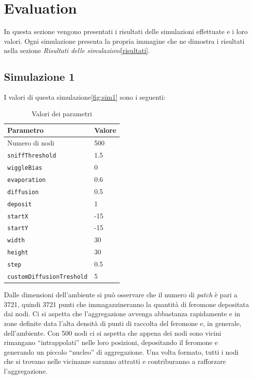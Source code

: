 \chapter{Evaluation}
In questa sezione vengono presentati i risultati delle simulazioni effettuate e i loro valori.
Ogni simulazione presenta la propria immagine che ne dimostra i risultati nella sezione \textit{Risultati delle simulazioni}\space\cref{risultati}.
\section{Simulazione 1}\label{sim1}
I valori di questa simulazione\space \cref{fig:sim1} sono i seguenti:
\begin{table}[ht]
    \centering
    \caption{Valori dei parametri}
    \begin{tabular}{ll}
        \toprule
        Parametro                   & Valore \\
        \midrule
        Numero di nodi              & 500    \\
        \texttt{sniffThreshold}     & 1.5    \\
        \texttt{wiggleBias}         & 0      \\
        \texttt{evaporation}        & 0.6    \\
        \texttt{diffusion}          & 0.5    \\
        \texttt{deposit}            & 1      \\
        \texttt{startX}             & -15    \\
        \texttt{startY}             & -15    \\
        \texttt{width}              & 30     \\
        \texttt{height}             & 30     \\
        \texttt{step}               & 0.5    \\
        \texttt{customDiffusionTreshold} & 5 \\
        \bottomrule
    \end{tabular}\label{tab:parametri1}
\end{table}\newline
Dalle dimensioni dell'ambiente si può osservare che il numero di \textit{patch} è pari a 3721, quindi 3721 punti che 
immagazzineranno la quantità di feromone depositata dai nodi. Ci si aspetta che l'aggregazione avvenga abbastanza rapidamente e in
zone definite data l'alta densità di punti di raccolta del feromone e, in generale, dell'ambiente. Con 500 nodi 
ci si aspetta che appena dei nodi sono vicini rimangano ``intrappolati'' nelle loro posizioni, depositando il feromone e 
generando un piccolo ``nucleo'' di aggregazione. Una volta formato, tutti i nodi che si trovano nelle vicinanze saranno attratti
e contriburanno a rafforzare l'aggregazione.


